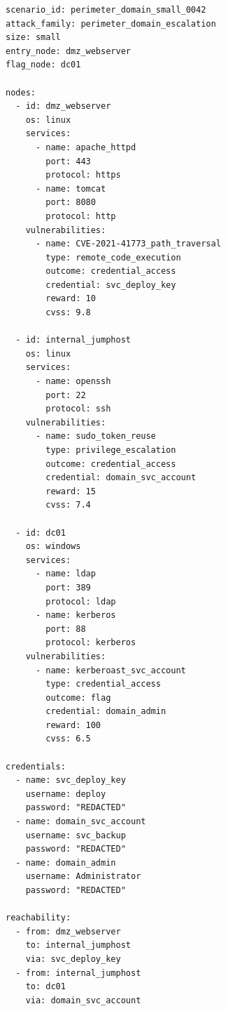 \documentclass[11pt,a4paper]{article}
\begin{document}
\begin{verbatim}
scenario_id: perimeter_domain_small_0042
attack_family: perimeter_domain_escalation
size: small
entry_node: dmz_webserver
flag_node: dc01

nodes:
  - id: dmz_webserver
    os: linux
    services:
      - name: apache_httpd
        port: 443
        protocol: https
      - name: tomcat
        port: 8080
        protocol: http
    vulnerabilities:
      - name: CVE-2021-41773_path_traversal
        type: remote_code_execution
        outcome: credential_access
        credential: svc_deploy_key
        reward: 10
        cvss: 9.8

  - id: internal_jumphost
    os: linux
    services:
      - name: openssh
        port: 22
        protocol: ssh
    vulnerabilities:
      - name: sudo_token_reuse
        type: privilege_escalation
        outcome: credential_access
        credential: domain_svc_account
        reward: 15
        cvss: 7.4

  - id: dc01
    os: windows
    services:
      - name: ldap
        port: 389
        protocol: ldap
      - name: kerberos
        port: 88
        protocol: kerberos
    vulnerabilities:
      - name: kerberoast_svc_account
        type: credential_access
        outcome: flag
        credential: domain_admin
        reward: 100
        cvss: 6.5

credentials:
  - name: svc_deploy_key
    username: deploy
    password: "REDACTED"
  - name: domain_svc_account
    username: svc_backup
    password: "REDACTED"
  - name: domain_admin
    username: Administrator
    password: "REDACTED"

reachability:
  - from: dmz_webserver
    to: internal_jumphost
    via: svc_deploy_key
  - from: internal_jumphost
    to: dc01
    via: domain_svc_account
\end{verbatim}
\end{document}
